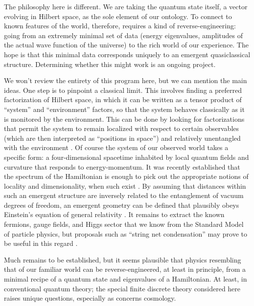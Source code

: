 \documentclass[aps,prd,twocolumn,nofootinbib,notitlepage]{revtex4-1}
\begin{document}
The philosophy here is different. 
We are taking the quantum state itself, a vector evolving in Hilbert space, as the sole element of our ontology. 
To connect to known features of the world, therefore, requires a kind of reverse-engineering: going from an extremely minimal set of data (energy eigenvalues, amplitudes of the actual wave function of the universe) to the rich world of our experience.
The hope is that this minimal data corresponds uniquely to an emergent quasiclassical structure.
Determining whether this might work is an ongoing project.

We won't review the entirety of this program here, but we can mention the main ideas.
One step is to pinpoint a classical limit.
This involves finding a preferred factorization of Hilbert space, in which it can be written as a tensor product of ``system'' and ``environment'' factors, so that the system behaves classically as it is monitored by the environment.
This can be done by looking for factorizations that permit the system to remain localized with respect to certain observables (which are then interpreted as ``positions in space'') and relatively unentangled with the environment \cite{Carroll:2020gme}.
Of course the system of our observed world takes a specific form: a four-dimensional spacetime inhabited by local quantum fields and curvature that responds to energy-momentum.
It was recently established that the spectrum of the Hamiltonian is enough to pick out the appropriate notions of locality and dimensionality, when such exist \cite{Cotler:2017abq}.
By assuming that distances within such an emergent structure are inversely related to the entanglement of vacuum degrees of freedom, an emergent geometry can be defined that plausibly obeys Einstein's equation of general relativity \cite{Cao:2016mst,Cao:2017hrv}.
It remains to extract the known fermions, gauge fields, and Higgs sector that we know from the Standard Model of particle physics, but proposals such as ``string net condensation'' may prove to be useful in this regard \cite{Levin:2004mi}.

Much remains to be established, but it seems plausible that physics resembling that of our familiar world can be reverse-engineered, at least in principle, from a minimal recipe of a quantum state and eigenvalues of a Hamiltonian.
At least, in conventional quantum theory; the special finite discrete theory considered here raises unique questions, especially as concerns cosmology.
\end{document}
